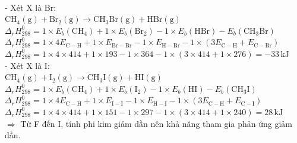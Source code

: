 \documentclass[Main.tex]{subfiles}
\begin{document}
\begin{bt}
{		\\
		- Xét X là Br:
		\\
		$\mathrm{CH_4(g) + Br_2(g) \longrightarrow CH_3Br(g) + HBr(g)}$
		\\
		$\Delta_rH_{298}^0 = 1 \times E_b (\mathrm{CH_4}) + 1 \times E_b (\mathrm{Br_2}) - 1 \times E_b (\mathrm{HBr}) -  E_b (\mathrm{CH_3Br})$
		\\
		$\Delta_rH_{298}^0 = 1 \times 4E_{\mathrm{C-H}} + 1 \times E_{\mathrm{Br-Br}} - 1 \times E_{\mathrm{H-Br}} - 1 \times (3E_{\mathrm{C-H}} + E_{\mathrm{C-Br}})$
		\\
		$\Delta_rH_{298}^0 = 1 \times 4 \times 414 + 1 \times 193 - 1 \times 364 - 1 \times (3 \times 414 + 1 \times 276) = -33\,\mathrm{kJ}$
		\\
		- Xét X là I:
		\\
		$\mathrm{CH_4(g) + I_2(g) \longrightarrow CH_3I(g) + HI(g)}$
		\\
		$\Delta_rH_{298}^0 = 1 \times E_b (\mathrm{CH_4}) + 1 \times E_b (\mathrm{I_2}) - 1 \times E_b (\mathrm{HI}) -  E_b (\mathrm{CH_3I})$
		\\
		$\Delta_rH_{298}^0 = 1 \times 4E_{\mathrm{C-H}} + 1 \times E_{\mathrm{I-I}} - 1 \times E_{\mathrm{H-I}} - 1 \times (3E_{\mathrm{C-H}} + E_{\mathrm{C-I}})$
		\\
		$\Delta_rH_{298}^0 = 1 \times 4 \times 414 + 1 \times 151 - 1 \times 297 - 1 \times (3 \times 414 + 1 \times 240) = 28\,\mathrm{kJ}$
		\\
		$\Rightarrow$ Từ F đến I, tính phi kim giảm dần nên khả năng tham gia phản ứng giảm dần.
	}
\end{bt}
\end{document}
